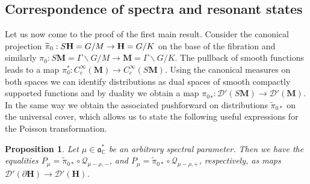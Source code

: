 \documentclass[10pt]{amsart}
\newtheorem{prop}[cdrthm]{Proposition}
\theoremstyle{definition}
\newcommand{\cc}{\mathbb{C}}
\newcommand{\bfh}{\mathbf{H}}
\newcommand{\bfm}{\mathbf{M}}
\newcommand{\pl}{\partial}
\newcommand{\til}{\widetilde}
\renewcommand{\a}{\mathfrak a}
\begin{document}
\subsection{Correspondence of spectra and resonant states}

Let us now come to the proof of the first main result. Consider the canonical projection $\til{\pi}_0: S{\bfh}= G/M\to {\bf H}=G/K$ on the base of the fibration and similarly $\pi_0: S{\bfm}=\Gamma\backslash G/M\to {\bfm}=\Gamma\backslash G/K$. The pullback of smooth functions leads to a map $\pi_0^*: C_c^\infty({\bfm}) \to C_c^\infty(S{\bfm})$. Using the canonical measures on both spaces we can identify distributions as dual spaces of smooth compactly supported functions and by duality we obtain a map ${\pi_0}_*: \mathcal D'(S{\bfm}) \to \mathcal D'({\bfm})$. In the same way we obtain the associated pushforward on distributions $\til \pi_{0*}$ on the universal cover, which allows us to state the following useful expressions for the Poisson transformation.

\begin{prop}\label{prop:poisson_projection}
Let $\mu\in \a^*_\cc$ be an arbitrary spectral parameter. Then we have the equalities $P_\mu = \til{\pi}_{0*} \circ \mathcal Q_{\mu-\rho, -}$, and $P_\mu = \til{\pi}_{0*} \circ \mathcal Q_{\mu-\rho, +}$, respectively, as maps $\mathcal D'(\pl {\bfh}) \to \mathcal D'({\bfh})$.
\end{prop}
\end{document}
